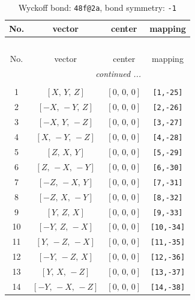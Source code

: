 \documentclass[fleqn,8pt]{jsarticle}
\begin{document}
\begin{longtable}{cccc}
\caption{Wyckoff bond: {\tt 48f@2a}, bond symmetry: {\tt -1}}
 \\
 \hline \hline
No. & vector & center & mapping \\ \hline \endfirsthead

\multicolumn{3}{l}{\tablename\ \thetable{}} \\
 \hline \hline
No. & vector & center & mapping \\ \hline \endhead

 \hline \hline
\multicolumn{3}{r}{\footnotesize\it continued ...} \\ \endfoot

 \hline \hline
\multicolumn{3}{r}{} \\ \endlastfoot

1 & $\left[ X,\, Y,\, Z \right]$ & $\left[ 0,\, 0,\, 0 \right]$ & {\tt [1,-25]} \\ \hline
2 & $\left[ - X,\, - Y,\, Z \right]$ & $\left[ 0,\, 0,\, 0 \right]$ & {\tt [2,-26]} \\ \hline
3 & $\left[ - X,\, Y,\, - Z \right]$ & $\left[ 0,\, 0,\, 0 \right]$ & {\tt [3,-27]} \\ \hline
4 & $\left[ X,\, - Y,\, - Z \right]$ & $\left[ 0,\, 0,\, 0 \right]$ & {\tt [4,-28]} \\ \hline
5 & $\left[ Z,\, X,\, Y \right]$ & $\left[ 0,\, 0,\, 0 \right]$ & {\tt [5,-29]} \\ \hline
6 & $\left[ Z,\, - X,\, - Y \right]$ & $\left[ 0,\, 0,\, 0 \right]$ & {\tt [6,-30]} \\ \hline
7 & $\left[ - Z,\, - X,\, Y \right]$ & $\left[ 0,\, 0,\, 0 \right]$ & {\tt [7,-31]} \\ \hline
8 & $\left[ - Z,\, X,\, - Y \right]$ & $\left[ 0,\, 0,\, 0 \right]$ & {\tt [8,-32]} \\ \hline
9 & $\left[ Y,\, Z,\, X \right]$ & $\left[ 0,\, 0,\, 0 \right]$ & {\tt [9,-33]} \\ \hline
10 & $\left[ - Y,\, Z,\, - X \right]$ & $\left[ 0,\, 0,\, 0 \right]$ & {\tt [10,-34]} \\ \hline
11 & $\left[ Y,\, - Z,\, - X \right]$ & $\left[ 0,\, 0,\, 0 \right]$ & {\tt [11,-35]} \\ \hline
12 & $\left[ - Y,\, - Z,\, X \right]$ & $\left[ 0,\, 0,\, 0 \right]$ & {\tt [12,-36]} \\ \hline
13 & $\left[ Y,\, X,\, - Z \right]$ & $\left[ 0,\, 0,\, 0 \right]$ & {\tt [13,-37]} \\ \hline
14 & $\left[ - Y,\, - X,\, - Z \right]$ & $\left[ 0,\, 0,\, 0 \right]$ & {\tt [14,-38]} \\ \hline

\end{longtable}
\end{document}
